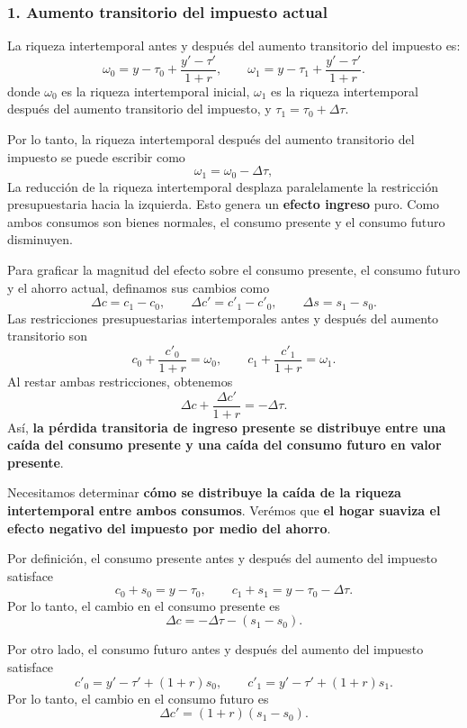 \documentclass[11pt]{article}
\begin{document}
\subsubsection*{1. Aumento transitorio del impuesto actual}
La riqueza intertemporal antes y después del aumento transitorio del impuesto es:
$$
\omega_0 = y - \tau_0 + \frac{y' - \tau'}{1+r}, 
\qquad
\omega_1 = y - \tau_1 + \frac{y' - \tau'}{1+r}.
$$
donde \(\omega_0\) es la riqueza intertemporal inicial, \(\omega_1\) es la riqueza intertemporal después del aumento transitorio del impuesto, y \(\tau_1=\tau_0+\Delta\tau\).

Por lo tanto, la riqueza intertemporal después del aumento transitorio del impuesto se puede escribir como
\[
  \omega_1=\omega_0-\Delta\tau,
\]
La reducción de la riqueza intertemporal desplaza paralelamente la restricción presupuestaria hacia la izquierda. Esto genera un \textbf{efecto ingreso} puro. Como ambos consumos son bienes normales, el consumo presente y el consumo futuro disminuyen.

Para graficar la magnitud del efecto sobre el consumo presente, el consumo futuro y el ahorro actual, definamos sus cambios como
\[
  \Delta c=c_1-c_0,
  \qquad
  \Delta c'=c'_1-c'_0,
  \qquad
  \Delta s=s_1-s_0.
\]
Las restricciones presupuestarias intertemporales antes y después del aumento transitorio son
\[
  c_0+\frac{c'_0}{1+r}=\omega_0,
  \qquad
  c_1+\frac{c'_1}{1+r}=\omega_1.
\]
Al restar ambas restricciones, obtenemos
\[
  \Delta c+\frac{\Delta c'}{1+r}
  =
  -\Delta\tau.
\]
Así, \textbf{la pérdida transitoria de ingreso presente se distribuye entre una caída del consumo presente y una caída del consumo futuro en valor presente}.

Necesitamos determinar \textbf{cómo se distribuye la caída de la riqueza intertemporal entre ambos consumos}. Verémos que \textbf{el hogar suaviza el efecto negativo del impuesto por medio del ahorro}. 

Por definición, el consumo presente antes y después del aumento del impuesto satisface
\[
  c_0+s_0=y-\tau_0,
  \qquad
  c_1+s_1=y-\tau_0-\Delta\tau.
\]
Por lo tanto, el cambio en el consumo presente es
\begin{equation}
  \boxed{
    \Delta c
    =
    -\Delta\tau-(s_1-s_0).
    \label{eq:DeltaCTran}
  }
\end{equation}

Por otro lado, el consumo futuro antes y después del aumento del impuesto satisface
\[
  c'_0=y'-\tau'+(1+r)s_0,
  \qquad
  c'_1=y'-\tau'+(1+r)s_1.
\]
Por lo tanto, el cambio en el consumo futuro es
\begin{equation}
  \boxed{
    \Delta c'=(1+r)(s_1-s_0).
    \label{eq:DeltaCpTran}
  }
\end{equation}
\end{document}
